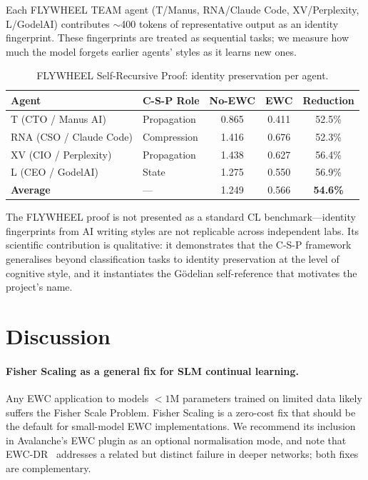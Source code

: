 \documentclass[12pt]{article}
\begin{document}
Each FLYWHEEL TEAM agent (T/Manus, RNA/Claude Code, XV/Perplexity, L/GodelAI)
contributes $\sim$400 tokens of representative output as an identity fingerprint.
These fingerprints are treated as sequential tasks; we measure how much the model
forgets earlier agents' styles as it learns new ones.

\begin{table}[ht]
\centering
\caption{FLYWHEEL Self-Recursive Proof: identity preservation per agent.}
\label{tab:flywheel}
\begin{tabular}{llccc}
\toprule
\textbf{Agent} & \textbf{C-S-P Role} & \textbf{No-EWC} & \textbf{EWC} & \textbf{Reduction} \\
\midrule
T   (CTO / Manus AI)    & Propagation & 0.865 & 0.411 & 52.5\% \\
RNA (CSO / Claude Code) & Compression & 1.416 & 0.676 & 52.3\% \\
XV  (CIO / Perplexity)  & Propagation & 1.438 & 0.627 & 56.4\% \\
L   (CEO / GodelAI)     & State       & 1.275 & 0.550 & 56.9\% \\
\midrule
\textbf{Average}        & ---         & 1.249 & 0.566 & \textbf{54.6\%} \\
\bottomrule
\end{tabular}
\end{table}

The FLYWHEEL proof is not presented as a standard CL benchmark---identity
fingerprints from AI writing styles are not replicable across independent labs.
Its scientific contribution is qualitative: it demonstrates that the C-S-P
framework generalises beyond classification tasks to identity preservation at
the level of cognitive style, and it instantiates the G\"{o}delian
self-reference that motivates the project's name.

\section{Discussion}
\label{sec:discussion}

\paragraph{Fisher Scaling as a general fix for SLM continual learning.}
Any EWC application to models $<1$M parameters trained on limited data likely
suffers the Fisher Scale Problem.
Fisher Scaling is a zero-cost fix that should be the default for small-model
EWC implementations.
We recommend its inclusion in Avalanche's EWC plugin as an optional
normalisation mode, and note that EWC-DR~\citep{ewcdr2026} addresses a related
but distinct failure in deeper networks; both fixes are complementary.
\end{document}
